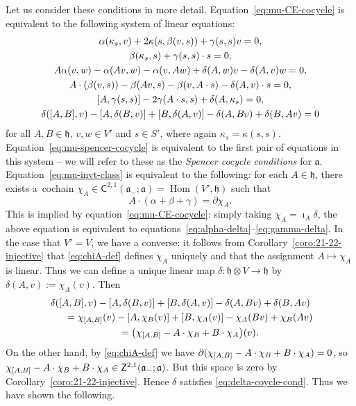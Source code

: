 \documentclass[11pt]{article}
\numberwithin{equation}{section}
\numberwithin{equation}{section}
\newcommand{\fa}{\mathfrak{a}}
\newcommand{\fh}{\mathfrak{h}}
\newcommand{\ssC}{\mathsf{C}}
\newcommand{\ssZ}{\mathsf{Z}}
\newcommand{\1}{\mathbbm{1}}
\DeclareMathOperator{\Hom}{Hom}
\begin{document}
Let us consider these conditions in more detail. Equation~\eqref{eq:mu-CE-cocycle} is equivalent to the following system of linear equations:
\begin{gather}
	\alpha(\kappa_s,v) + 2\kappa(s,\beta(v,s)) + \gamma(s,s)v = 0,\label{eq:22-spencer-cocycle-vss} \\
	\beta(\kappa_s,s) + \gamma(s,s)\cdot s = 0,\label{eq:22-spencer-cocycle-sss}	\\
	A\alpha(v,w) - \alpha(Av,w) - \alpha(v,Aw) + \delta(A,w)v - \delta(A,v)w = 0,\label{eq:alpha-delta} \\
	A\cdot(\beta(v,s)) - \beta(Av,s) - \beta(v,A\cdot s) - \delta(A,v)\cdot s = 0,\label{eq:beta-delta} \\
	\comm{A}{\gamma(s,s)} - 2\gamma(A\cdot s,s) + \delta(A,\kappa_s) = 0,\label{eq:gamma-delta} \\
	\delta(\comm{A}{B},v) - \comm{A}{\delta(B,v)} + \comm{B}{\delta(A,v)} - \delta(A,Bv) + \delta(B,Av) = 0 \label{eq:delta-coycle-cond}
\end{gather}
for all $A,B\in\fh$, $v,w\in V'$ and $s\in S'$, where again $\kappa_s=\kappa(s,s)$. Equation~\eqref{eq:mu-spencer-cocycle} is equivalent to the first pair of equations in this system -- we will refer to these as the \emph{Spencer cocycle conditions} for $\fa$. Equation~\eqref{eq:mu-invt-class} is equivalent to the following: for each $A\in\fh$, there exists a~cochain $\chi_A\in \ssC^{2,1}(\fa_-;\fa)=\Hom(V',\fh)$ such that
\begin{equation}\label{eq:chiA-def}
	A\cdot(\alpha+\beta+\gamma) = \partial\chi_A.
\end{equation}
This is implied by equation~\eqref{eq:mu-CE-cocycle}: simply taking $\chi_A=\imath_A\delta$, the above equation is equivalent to equations~\eqref{eq:alpha-delta}--\eqref{eq:gamma-delta}. In the case that $V'=V$, we have a converse: it follows from Corollary~\ref{coro:21-22-injective} that \eqref{eq:chiA-def} defines $\chi_A$ uniquely and that the assignment $A\mapsto\chi_A$ is linear. Thus we can define a unique linear map $\delta\colon \fh\otimes V\to\fh$ by $\delta(A,v):=\chi_A(v)$. Then
\begin{gather*}
	\delta(\comm{A}{B},v) - \comm{A}{\delta(B,v)} + \comm{B}{\delta(A,v)} - \delta(A,Bv) + \delta(B,Av)\\
	\qquad= \chi_{\comm{A}{B}}(v) - \comm{A}{\chi_B(v)} + \comm{B}{\chi_A(v)}	- \chi_A(Bv) + \chi_B(Av)	\\
	\qquad= \qty(\chi_{\comm{A}{B}} - A\cdot\chi_B + B\cdot\chi_A)(v).
\end{gather*}
On the other hand, by \eqref{eq:chiA-def} we have
$\partial(\chi_{\comm{A}{B}} - A\cdot\chi_B + B\cdot\chi_A) = 0$,
so $\chi_{\comm{A}{B}} - A\cdot\chi_B + B\cdot\chi_A\in\ssZ^{2,1}(\fa_-;\fa)$. But this space is zero by Corollary~\ref{coro:21-22-injective}. Hence $\delta$ satisfies \eqref{eq:delta-coycle-cond}. Thus we have shown the following.
\end{document}
